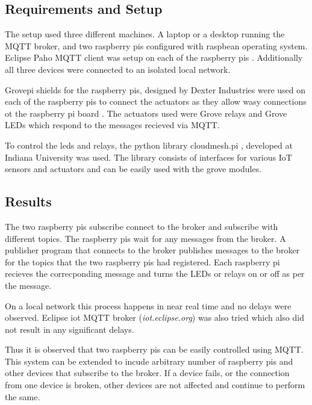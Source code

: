 \documentclass[sigconf]{acmart}
\begin{document}
\subsection{Requirements and Setup}
The setup used three different machines. A laptop or a desktop running the MQTT broker, and two raspberry pis configured with raspbean operating system. Eclipse Paho MQTT client was setup on each of the raspberry pis \cite{python-paho-mqtt}. Additionally all three devices were connected to an isolated local network.

Grovepi shields for the raspberry pis, designed by Dexter Industries were used on each of the raspberry pis to connect the actuators as they allow wasy connections ot the raspberry pi board \cite{grovepi}. The actuators used were Grove relays \cite{grove-relay} and Grove LEDs \cite{grove-led} which respond to the messages recieved via MQTT.

To control the leds and relays, the python library cloudmesh.pi \cite{cloudmesh.pi}, developed at Indiana University was used. The library consists of interfaces for various IoT sensors and actuators and can be easily used with the grove modules.



\subsection{Results}

The two raspberry pis subscribe connect to the broker and subscribe with different topics. The raspberry pis wait for any messages from the broker. A publisher program that connects to the broker publishes messages to the broker for the topics that the two raspberry pis had registered. Each raspberry pi recieves the correcponding message and turns the LEDs or relays on or off as per the message.

On a local network this process happens in near real time and no delays were observed. Eclipse iot MQTT broker ({\em iot.eclipse.org}) was also tried which also did not result in any significant delays.

Thus it is observed that two raspberry pis can be easily controlled using MQTT. This system can be extended to incude arbitrary number of raspberry pis and other devices that subscribe to the broker. If a device fails, or the connection from one device is broken, other devices are not affected and continue to perform the same.
\end{document}
